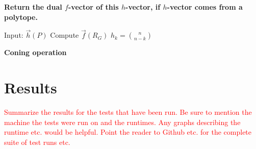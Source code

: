 \documentclass[oneside,12pt]{amsart}
\theoremstyle{definition}
\numberwithin{equation}{section}
\begin{document}
\vspace{.5in}

\begin{center}
\textbf{Return the dual $f$-vector of this $h$-vector, if $h$-vector comes from a polytope.}
\end{center}

\vspace{.1in}


\begin{algorithmic}
\State Input: $\overrightarrow{h}(P)$
\State Compute $\overrightarrow{f}(R_G)$
\State    $h_k = {n \choose n-k}$
\Else
{}%
\EndIf
\EndFor
\EndFor
\end{algorithmic}




\textbf{Coning operation}

\section{Results} \label{results}






\textcolor{red}{
Summarize the results for the tests that have been run.  Be sure to mention the machine the tests were run on and the runtimes.  Any graphs describing the runtime etc. would be helpful. Point the reader to Github etc. for the complete suite of test runs etc.}
\end{document}
